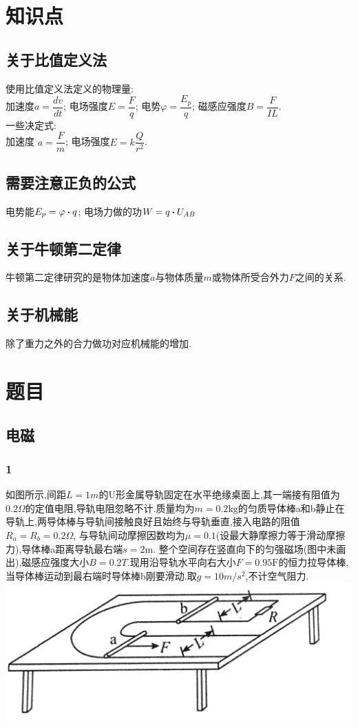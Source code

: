 \documentclass{article}
\begin{document}
\section*{知识点}
\subsection*{关于比值定义法}
使用比值定义法定义的物理量: 
\\
加速度$a = \dfrac{dv}{dt}$; 电场强度$E = \dfrac{F}{q}$; 电势$\varphi = \dfrac{E_p}{q}$; 磁感应强度$B = \dfrac{F}{IL}$.
\\
一些决定式: 
\\
加速度 $a = \dfrac{F}{m}$; 电场强度$E = k\dfrac{Q}{r^2}$.

\subsection*{需要注意正负的公式}
电势能$E_p = \varphi \dotproduct q$; 电场力做的功$W = q \dotproduct U_{AB}$

\subsection*{关于牛顿第二定律}
牛顿第二定律研究的是物体加速度$a$与物体质量$m$或物体所受合外力$F$之间的关系.

\subsection*{关于机械能}
除了重力之外的合力做功对应机械能的增加.

\section{题目}
\subsection{电磁}
\subsubsection*{1}
如图所示,间距$L = 1m$的U形金属导轨固定在水平绝缘桌面上,其一端接有阻值为$0.2 \Omega$的定值电阻,导轨电阻忽略不计.质量均为$m = 0.2
\text{kg}$的匀质导体棒a和b静止在导轨上,两导体棒与导轨间接触良好且始终与导轨垂直,接入电路的阻值$R_a = R_b = 0.2 \Omega $,
与导轨间动摩擦因数均为$\mu = 0.1$(设最大静摩擦力等于滑动摩擦力),导体棒a距离导轨最右端$s = 2 \text{m}$.
整个空间存在竖直向下的匀强磁场(图中未画出),磁感应强度大小$B = 0.2T$.现用沿导轨水平向右大小$F = 0.95 \text{F}$的恒力拉导体棒,
当导体棒运动到最右端时导体棒b刚要滑动.取$g = 10m/s^2$,不计空气阻力.\\
\includegraphics[height=6\baselineskip]{1.png}
\end{document}
